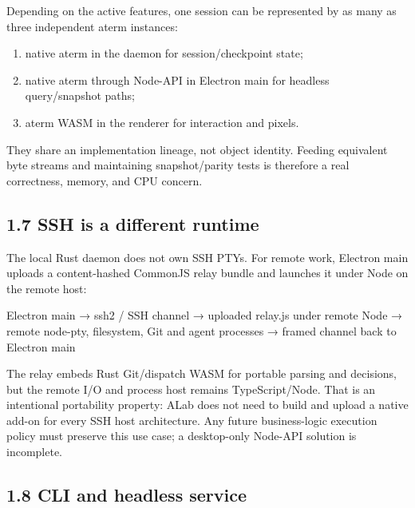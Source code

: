 \documentclass[
  10pt,
  letterpaper,
]{article}
\newenvironment{Shaded}{\begin{snugshade}}{\end{snugshade}}
\newcommand{\NormalTok}[1]{#1}
\providecommand{\tightlist}{%
  \setlength{\itemsep}{0pt}\setlength{\parskip}{0pt}}
\begin{document}
Depending on the active features, one session can be represented by as
many as three independent aterm instances:

\begin{enumerate}
\def\labelenumi{\arabic{enumi}.}
\tightlist
\item
  native aterm in the daemon for session/checkpoint state;
\item
  native aterm through Node-API in Electron main for headless
  query/snapshot paths;
\item
  aterm WASM in the renderer for interaction and pixels.
\end{enumerate}

They share an implementation lineage, not object identity. Feeding
equivalent byte streams and maintaining snapshot/parity tests is
therefore a real correctness, memory, and CPU concern.

\subsection{1.7 SSH is a different
runtime}\label{17-ssh-is-a-different-runtime}

The local Rust daemon does not own SSH PTYs. For remote work, Electron
main uploads a content-hashed CommonJS relay bundle and launches it
under Node on the remote host:

\begin{Shaded}
\begin{Highlighting}[]
\NormalTok{Electron main}
\NormalTok{  → ssh2 / SSH channel}
\NormalTok{  → uploaded relay.js under remote Node}
\NormalTok{  → remote node{-}pty, filesystem, Git and agent processes}
\NormalTok{  → framed channel back to Electron main}
\end{Highlighting}
\end{Shaded}

The relay embeds Rust Git/dispatch WASM for portable parsing and
decisions, but the remote I/O and process host remains TypeScript/Node.
That is an intentional portability property: ALab does not need to build
and upload a native add-on for every SSH host architecture. Any future
business-logic execution policy must preserve this use case; a
desktop-only Node-API solution is incomplete.

\subsection{1.8 CLI and headless
service}\label{18-cli-and-headless-service}
\end{document}

